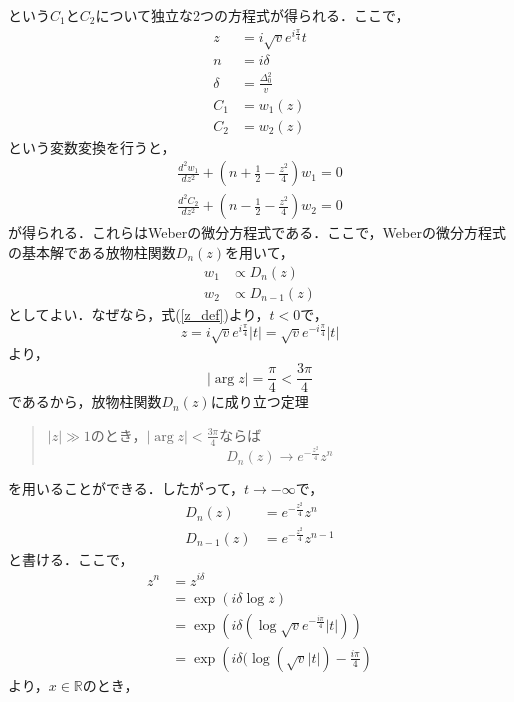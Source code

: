 \documentclass[a4paper, titlepage]{jsreport}
\begin{document}
という$C_1$と$C_2$について独立な2つの方程式が得られる．ここで，
\begin{align}
  z &= i\sqrt{v} e^{i\frac{\pi}{4}} t \label{z_def}\\
  n &= i\delta\\
  \delta &= \frac{\Delta_0^2}{v}\\
  C_1 &= w_1(z)\\
  C_2 &= w_2(z)
\end{align}
という変数変換を行うと，
\begin{align}
  \frac{d^2 w_1}{d z^2} + \left(n + \frac{1}{2} - \frac{z^2}{4}\right) w_1 = 0\\
  \frac{d^2 C_2}{d z^2} + \left(n - \frac{1}{2} - \frac{z^2}{4}\right) w_2 = 0
\end{align}
が得られる．これらはWeberの微分方程式である．ここで，Weberの微分方程式の基本解である放物柱関数$D_n(z)$を用いて，
\begin{align}
  w_1 &\propto D_n(z)\\
  w_2 &\propto D_{n-1}(z)
\end{align}
としてよい．なぜなら，式(\ref{z_def})より，$t<0$で，
\begin{equation}
  z = i\sqrt{v} e^{i\frac{\pi}{4}} |t| = \sqrt{v} e^{-i\frac{\pi}{4}} |t|
\end{equation}
より，
\begin{equation}
  |\arg z| = \frac{\pi}{4} < \frac{3\pi}{4}
\end{equation}
であるから，放物柱関数$D_n(z)$に成り立つ定理
\begin{quote}
  $|z| \gg 1$のとき，$|\arg z| < \frac{3\pi}{4}$ならば
  \begin{equation}
    D_n(z) \rightarrow e^{-\frac{z^2}{4}} z^n
  \end{equation}
\end{quote}
を用いることができる．したがって，$t \rightarrow - \infty$で，
\begin{align}
  D_n(z) &= e^{-\frac{z^2}{4}} z^n\\
  D_{n-1}(z) &= e^{-\frac{z^2}{4}} z^{n-1}
\end{align}
と書ける．ここで，
\begin{align}
  z^n
  &= z^{i\delta}\\
  &= \exp(i\delta \log z)\\
  &= \exp(i\delta (\log \sqrt{v} e^{-\frac{i\pi}{4}} |t|))\\
  &= \exp \left( i\delta (\log (\sqrt{v} |t|) - \frac{i\pi}{4} \right)
\end{align}
より，$x \in \mathbb{R}$のとき，
\end{document}
